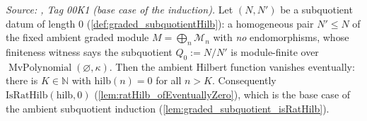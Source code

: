 \begin{lemma}\leanok
  \label{lem:graded_subquotient_base_eventuallyZero}
  \textit{Source: \cite{stacks-project}, Tag 00K1 (base case of the induction).}
  Let \((N, N')\) be a subquotient datum of length \(0\)
  (\cref{def:graded_subquotientHilb}): a homogeneous pair \(N' \le N\) of the fixed
  ambient graded module \(M = \bigoplus_n \mathcal{M}_n\) with \emph{no} endomorphisms,
  whose finiteness witness says the subquotient \(Q_0 := N/N'\) is module-finite over
  \(\operatorname{MvPolynomial}(\varnothing, \kappa)\). Then the ambient Hilbert
  function vanishes eventually: there is \(K \in \mathbb{N}\) with
  \(\mathrm{hilb}(n) = 0\) for all \(n > K\). Consequently
  \(\mathrm{IsRatHilb}(\mathrm{hilb}, 0)\) (\cref{lem:ratHilb_ofEventuallyZero}),
  which is the base case of the ambient subquotient induction
  (\cref{lem:graded_subquotient_isRatHilb}).
\end{lemma}

